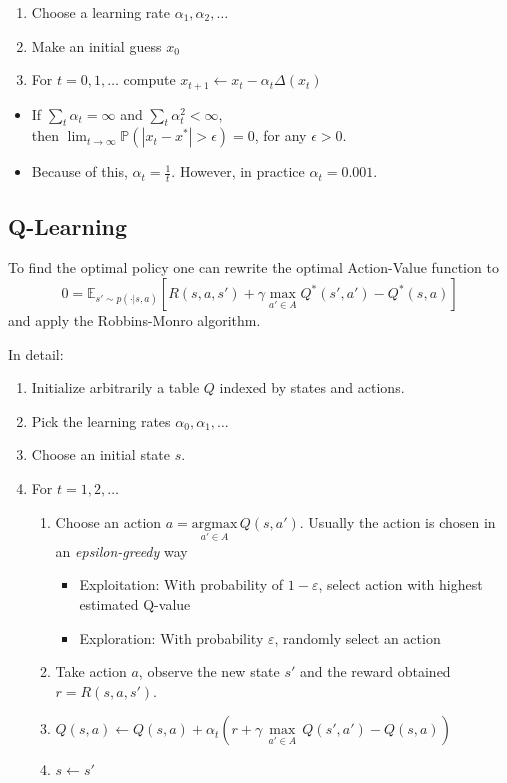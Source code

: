 \begin{enumerate}
    \item Choose a learning rate $\alpha_1, \alpha_2, \ldots$
    \item Make an initial guess $x_0$
    \item For $t={0,1,\ldots}$ compute $x_{t+1} \leftarrow x_t - \alpha_t \Delta(x_t)$
\end{enumerate}

\newpar{}
\begin{itemize}
    \item If $\sum_{t}\alpha_t = \infty$ and $\sum_{t}\alpha^2_t<\infty$, \\ then $\lim_{t\to\infty}\mathbb{P}(|x_t - x^*|>\epsilon) = 0$, for any $\epsilon > 0$.
    \item Because of this, $\alpha_t = \frac{1}{t}$. However, in practice $\alpha_t = 0.001$.
\end{itemize}

\subsection{Q-Learning}

To find the optimal policy one can rewrite the optimal Action-Value function to
\begin{equation*}
    0 = \mathbb{E}_{s'\sim p(\cdot|s,a)}\left[R(s,a,s') + \gamma \max_{a'\in A}Q^* (s',a') - Q^*(s,a)\right]
\end{equation*}
and apply the Robbins-Monro algorithm.


\newpar{}
In detail:
\begin{enumerate}
    \item Initialize arbitrarily a table $Q$ indexed by states and actions.
    \item Pick the learning rates $\alpha_0, \alpha_1, \ldots$
    \item Choose an initial state $s$.
    \item For $t = 1, 2, \ldots$
          \begin{enumerate}
              \item Choose an action $a = \underset{a'\in A}{\mathrm{argmax}}\,Q(s,a')$. Usually the action is chosen in an \textit{epsilon-greedy} way
              \begin{itemize}
                \item Exploitation: With probability of $1-\varepsilon$, select action with highest estimated Q-value
                \item Exploration: With probability $\varepsilon$, randomly select an action
              \end{itemize}
              \item Take action $a$, observe the new state $s'$ and the reward obtained $r=R(s,a,s')$.
              \item $Q(s,a) \leftarrow Q(s,a) + \alpha_t \left(r + \gamma\,\underset{a'\in A}{\max}\,Q(s',a')-Q(s,a)\right)$
              \item $s \leftarrow s'$
          \end{enumerate}
\end{enumerate}

